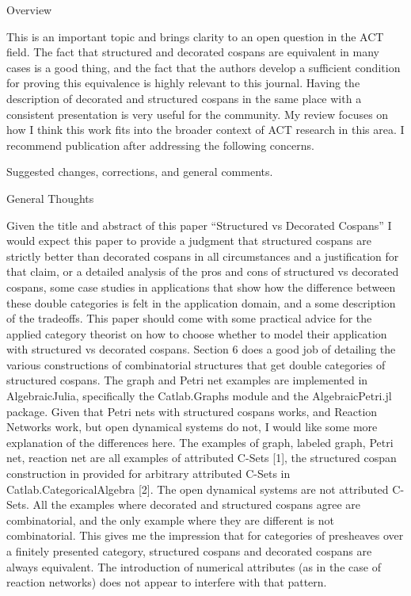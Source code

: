 \documentclass[reqno]{amsart}
\begin{document}
{\footnotesize

Overview

This is an important topic and brings clarity to an open question in the ACT field. The fact that structured and decorated cospans are equivalent in 
many cases is a good thing, and the fact that the authors develop a sufficient condition for proving this equivalence is highly relevant to this 
journal. Having the description of decorated and structured cospans in the same place with a consistent presentation is very useful for the community. 
My review focuses on how I think this work fits into the broader context of ACT research in this area. I recommend publication after addressing the 
following concerns.

Suggested changes, corrections, and general comments.

General Thoughts

Given the title and abstract of this paper “Structured vs Decorated Cospans” I would expect this paper to provide a judgment that structured cospans 
are strictly better than decorated cospans in all circumstances and a justification for that claim, or a detailed analysis of the pros and cons of 
structured vs decorated cospans, some case studies in applications that show how the difference between these double categories is felt in the 
application domain, and a some description of the tradeoffs. This paper should come with some practical advice for the applied category theorist on 
how to choose whether to model their application with structured vs decorated cospans. Section 6 does a good job of detailing the various 
constructions of combinatorial structures that get double categories of structured cospans. The graph and Petri net examples are implemented in 
AlgebraicJulia, specifically the Catlab.Graphs module and the AlgebraicPetri.jl package. Given that Petri nets with structured cospans works, and 
Reaction Networks work, but open dynamical systems do not, I would like some more explanation of the differences here. The examples of graph, labeled 
graph, Petri net, reaction net are all examples of attributed C-Sets [1], the structured cospan construction in provided for arbitrary attributed 
C-Sets in Catlab.CategoricalAlgebra [2]. The open dynamical systems are not attributed C-Sets. All the examples where decorated and structured cospans 
agree are combinatorial, and the only example where they are different is not combinatorial. This gives me the impression that for categories of 
presheaves over a finitely presented category, structured cospans and decorated cospans are always equivalent. The introduction of numerical 
attributes (as in the case of reaction networks) does not appear to interfere with that pattern.

}
\end{document}
